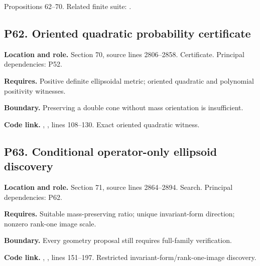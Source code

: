 \documentclass[11pt,oneside,openany]{book}
\numberwithin{equation}{section}
\begin{document}
Propositions 62--70. Related finite suite:
.

\par\noindent\begin{minipage}{\textwidth}
\subsection{P62. Oriented quadratic probability
certificate}\label{LSMRegister:p62.-oriented-quadratic-probability-certificate}

\textbf{Location and role.} Section 70, source lines 2806--2858.
Certificate. Principal dependencies: P52.

\textbf{Requires.} Positive definite ellipsoidal metric; oriented
quadratic and polynomial positivity witnesses.

\textbf{Boundary.} Preserving a double cone without mass orientation is
insufficient.

\textbf{Code link.} ,
, lines 108--130. Exact oriented quadratic
witness.
\end{minipage}\par\medskip

\par\noindent\begin{minipage}{\textwidth}
\subsection{P63. Conditional operator-only ellipsoid
discovery}\label{LSMRegister:p63.-conditional-operator-only-ellipsoid-discovery}

\textbf{Location and role.} Section 71, source lines 2864--2894. Search.
Principal dependencies: P62.

\textbf{Requires.} Suitable mass-preserving ratio; unique invariant-form
direction; nonzero rank-one image scale.

\textbf{Boundary.} Every geometry proposal still requires full-family
verification.

\textbf{Code link.} ,
, lines 151--197. Restricted
invariant-form/rank-one-image discovery.
\end{minipage}\par\medskip
\end{document}

